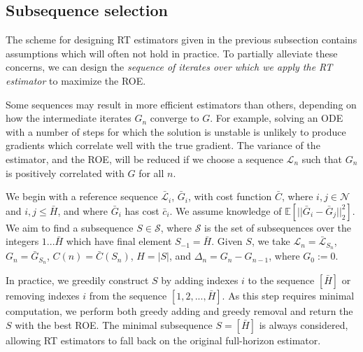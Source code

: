 \subsection{Subsequence selection}
The scheme for designing RT estimators given in the previous subsection
contains assumptions which will often not hold in practice. To partially
alleviate these concerns, we can design the \textit{sequence of iterates over
which we apply the RT estimator} to maximize the ROE.

Some sequences may result in more efficient estimators than others, depending on how the intermediate iterates $G_n$ converge to $G$.
For example, solving an ODE with a number of steps for which the solution is unstable is unlikely to produce gradients which correlate well with the true gradient.
The variance of the estimator, and the ROE, will be reduced if we choose a sequence $\mathcal{L}_n$ such that $G_n$ is positively correlated with $G$ for all $n$.

We begin with a reference sequence $\bar{\mathcal{L}}_i$, $\bar{G}_i$, with cost function $\bar{C}$, where $i, j \in \mathcal{N}$ and $i, j \leq \bar{H}$,
and where $\bar{G}_i$ has cost $\bar{c}_i$.
We assume knowledge of $\mathbb{E}[||\bar{G}_i \!-\! \bar{G}_j||_2^2]$.
We aim to find a subsequence $S \in \mathcal{S}$, where $\mathcal{S}$ is the
set of subsequences over the integers $1 ... \bar{H}$ which have final element
$S_{-1} = \bar{H}$. Given $S$, we take $\mathcal{L}_n = \bar{\mathcal{L}}_{S_n}$,
$G_n = \bar{G}_{S_n}$, $C(n) = \bar{C}(S_n)$, $H = |S|$, and
$\Delta_n = G_n - G_{n-1}$, where $G_0 := 0$.

In practice, we greedily construct $S$ by adding
indexes $i$ to the sequence $[\bar{H}]$ or removing indexes $i$ from the
sequence $[1, 2, ..., \bar{H}]$. As this step requires minimal computation, we
perform both greedy adding and greedy removal and return the $S$ with the best
ROE. The minimal subsequence $S = [\bar{H}]$ is always considered,
allowing RT estimators to fall back on the original full-horizon estimator.
